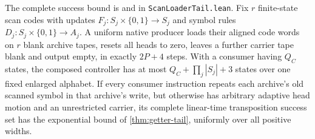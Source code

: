 \begin{proposition}\label{prop:scan-loader}
The complete success bound is
 and
in \texttt{ScanLoaderTail.lean}.
Fix $r$ finite-state scan codes with updates $F_j:S_j\times\{0,1\}\to S_j$
and symbol rules $D_j:S_j\times\{0,1\}\to A_j$. A uniform native producer
loads their aligned code words on $r$ blank archive tapes, resets all heads
to zero, leaves a further carrier tape blank and output empty, in exactly
$2P+4$ steps. With a consumer having $Q_C$ states, the composed controller
has at most $Q_C+\prod_j|S_j|+3$ states over one fixed enlarged alphabet.
If every consumer instruction repeats each archive's old scanned symbol in
that archive's write, but otherwise has arbitrary adaptive head motion and
an unrestricted carrier, its complete linear-time
transposition success set has the exponential bound of
\cref{thm:getter-tail}, uniformly over all positive widths.
\end{proposition}
